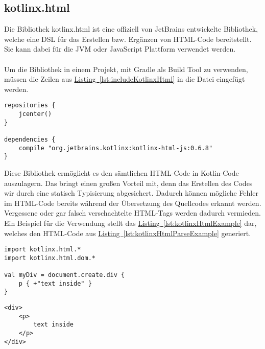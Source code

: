 \subsection{kotlinx.html}\label{sec:kotlinxHtml}
Die Bibliothek kotlinx.html \cite{kotlinxHtml} ist eine offiziell von JetBrains entwickelte Bibliothek, welche eine \gls{DSL} für das Erstellen bzw. Ergänzen von HTML-Code bereitstellt. Sie kann dabei für die \gls{JVM} oder JavaScript Plattform verwendet werden.\\
\\
Um die Bibliothek in einem Projekt, mit Gradle als Build Tool zu verwenden, müssen die Zeilen aus \hyperref[lst:includeKotlinxHtml]{Listing~\ref{lst:includeKotlinxHtml}} in die Datei  eingefügt werden.
\begin{lstlisting}[style=lstStyleFramed, language=Gradle, caption={Einbindung der Bibliothek kotlinx.html mithilfe von Gradle}, label=lst:includeKotlinxHtml, float]
repositories {
	jcenter()
}

dependencies {
	compile "org.jetbrains.kotlinx:kotlinx-html-js:0.6.8"
}
\end{lstlisting}
Diese Bibliothek ermöglicht es den sämtlichen HTML-Code in Kotlin-Code auszulagern. Das bringt einen großen Vorteil mit, denn das Erstellen des Codes wir durch eine statisch Typisierung abgesichert. Dadurch können mögliche Fehler im HTML-Code bereits während der Übersetzung des Quellcodes erkannt werden. Vergessene oder gar falsch verschachtelte HTML-Tags werden dadurch vermieden. Ein Beispiel für die Verwendung stellt das \hyperref[lst:kotlinxHtmlExample]{Listing~\ref{lst:kotlinxHtmlExample}} dar, welches den HTML-Code aus \hyperref[lst:kotlinxHtmlParseExample]{Listing~\ref{lst:kotlinxHtmlParseExample}} generiert.
\begin{lstlisting}[style=lstStyleFramed, caption={Beispiel: Verwendung der Bibliothek kotlinx.html \cite{kotlinxHtmlExample}}, label=lst:kotlinxHtmlExample]
import kotlinx.html.*
import kotlinx.html.dom.*

val myDiv = document.create.div {
	p { +"text inside" }
}
\end{lstlisting}
\begin{lstlisting}[style=lstStyleFramed, caption={Beispiel: Verwendung der Bibliothek kotlinx.html (Ergebnis)}, label=lst:kotlinxHtmlParseExample]
<div>
	<p>
		text inside
	</p>
</div>
\end{lstlisting}

